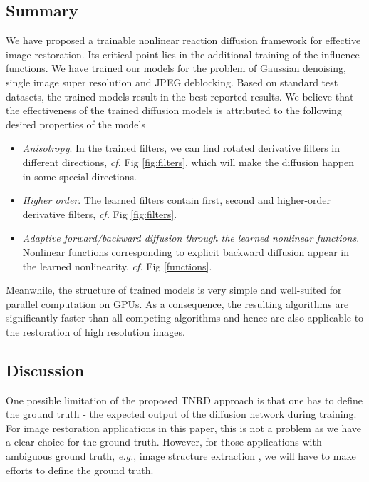 \documentclass[10pt,journal,compsoc]{IEEEtran}
\newcommand{\eg}{\emph{e.g.}}
\begin{document}
\subsection{Summary}
We have proposed a trainable nonlinear reaction diffusion framework for effective image restoration. Its critical point lies in 
the additional training of the influence functions. We have trained our models for 
the problem of Gaussian denoising, single image super resolution and JPEG deblocking. Based on standard test datasets, 
the trained models result in the best-reported results. 
We believe that the effectiveness of the trained diffusion models is attributed to the following desired properties of the models
\begin{itemize}
\setlength\itemsep{0em}
    \item \noindent \textit{Anisotropy}. In the trained filters, we can find rotated derivative filters in different directions, \textit{cf.} Fig 
\ref{fig:filters}, which will make the diffusion happen in some special directions. 
    \item \textit{Higher order}. The learned filters contain first, second and higher-order derivative filters, \textit{cf.} Fig 
\ref{fig:filters}.  
    \item \textit{Adaptive forward/backward diffusion through the learned nonlinear functions}. Nonlinear functions corresponding to 
explicit backward diffusion appear in the learned nonlinearity, \textit{cf.} Fig \ref{functions}.
\end{itemize}

Meanwhile, the structure of trained models is very simple 
and well-suited for parallel computation on GPUs. As a consequence, 
the resulting algorithms are significantly faster than all competing algorithms and hence are also applicable to the restoration 
of high resolution images. 

\subsection{Discussion}
One possible limitation of the proposed TNRD approach is that one has to define the ground truth - the expected output of the diffusion network during training. 
For image restoration applications in this paper, this is not a problem as we have a clear choice for the ground truth. 
However, for those applications with ambiguous ground truth, \eg, image structure extraction \cite{xu2012structure}, 
we will have to make efforts to define the ground truth.
\end{document}
